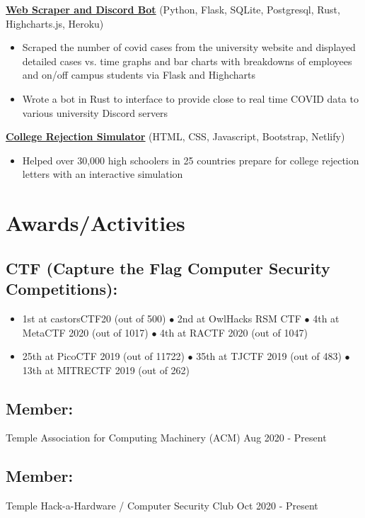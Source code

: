 \documentclass{article}
\begin{document}
\textbf{\href{https://github.com/jshin313/unofficial-temple-covid-live-dashboard}{\underline{Web Scraper and Discord Bot}}} \hfill (Python, Flask, SQLite, Postgresql, Rust, Highcharts.js, Heroku)
\begin{itemize}
    \item Scraped the number of covid cases from the university website and displayed detailed cases vs. time graphs and bar charts with breakdowns of employees and on/off campus students via Flask and Highcharts
    \item Wrote a bot in Rust to interface to provide close to real time COVID data to various university Discord servers
\end{itemize}

\textbf{\href{https://ivyhub.org/decision-letters/}{\underline{College Rejection Simulator}}} \hfill (HTML, CSS, Javascript, Bootstrap, Netlify)
\begin{itemize}
    \item Helped over 30,000 high schoolers in 25 countries prepare for college rejection letters with an interactive simulation
\end{itemize}

\section{Awards/Activities}
\subsection{CTF (Capture the Flag Computer Security Competitions):}
\begin{itemize}
    \item 1st at castorsCTF20 (out of 500) $\bullet$ 2nd at OwlHacks RSM CTF $\bullet$ 4th at MetaCTF 2020 (out of 1017) $\bullet$ 4th at RACTF 2020 (out of 1047)
    \item 25th at PicoCTF 2019 (out of 11722) $\bullet$ 35th at TJCTF 2019 (out of 483) $\bullet$ 13th at MITRECTF 2019 (out of 262)
\end{itemize} 
\subsection{Member: } Temple Association for Computing Machinery (ACM) \hfill Aug 2020 - Present
\subsection{Member: } Temple Hack-a-Hardware / Computer Security Club  \hfill Oct 2020 - Present
\end{document}
